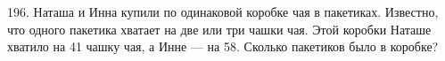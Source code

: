 196. Наташа и Инна купили по одинаковой коробке чая в пакетиках. Известно, что одного пакетика хватает на две или три чашки чая. Этой коробки Наташе хватило на 41 чашку чая, а Инне --- на 58. Сколько пакетиков было в коробке?\\
